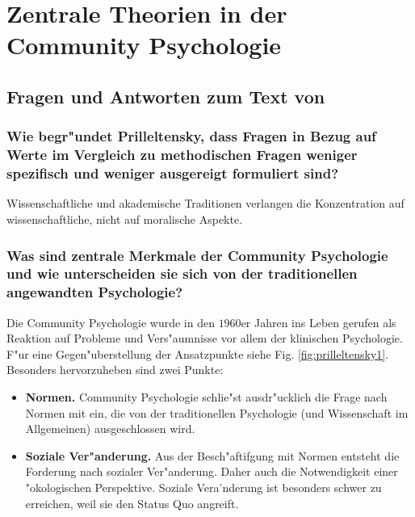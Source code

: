 \section{Zentrale Theorien in der Community Psychologie}

\subsection{Fragen und Antworten zum Text von \textcite{prilleltensky_value-based_2001}}
\subsubsection{Wie begr"undet Prilleltensky, dass Fragen in Bezug auf Werte im Vergleich zu methodischen Fragen weniger spezifisch und weniger ausgereigt formuliert sind?}
Wissenschaftliche und akademische Traditionen verlangen die Konzentration auf wissenschaftliche, nicht auf moralische Aspekte.

\subsubsection{Was sind zentrale Merkmale der Community Psychologie und wie unterscheiden sie sich von der traditionellen angewandten Psychologie?}
Die Community Psychologie wurde in den $1960$er Jahren ins Leben gerufen als Reaktion auf Probleme und Vers"aumnisse vor allem der klinischen Psychologie. F"ur eine Gegen"uberstellung der Ansatzpunkte siehe Fig. \ref{fig:prilleltensky1}. Besonders hervorzuheben sind zwei Punkte:

\begin{itemize}
        \item \textbf{Normen.} Community Psychologie schlie"st ausdr"ucklich die Frage nach Normen mit ein, die von der traditionellen Psychologie (und Wissenschaft im Allgemeinen) ausgeschlossen wird.
        \item \textbf{Soziale Ver"anderung.} Aus der Besch"aftifgung mit Normen entsteht die Forderung nach sozialer Ver"anderung. Daher auch die Notwendigkeit einer "okologischen Perspektive. Soziale Vera'nderung ist besonders schwer zu erreichen, weil sie den Status Quo angreift.
\end{itemize}

